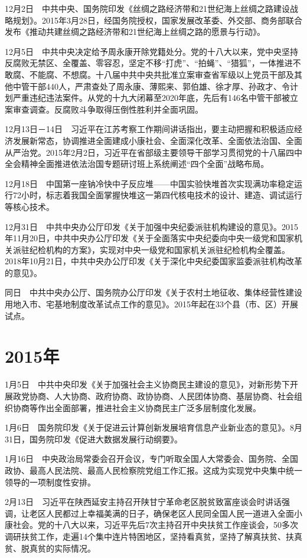 \documentclass[10pt,a4paper,twocolumn]{book}
\begin{document}
12月2日　中共中央、国务院印发《丝绸之路经济带和21世纪海上丝绸之路建设战略规划》。2015年3月28日，经国务院授权，国家发展改革委、外交部、商务部联合发布《推动共建丝绸之路经济带和21世纪海上丝绸之路的愿景与行动》。

12月5日　中共中央决定给予周永康开除党籍处分。党的十八大以来，党中央坚持反腐败无禁区、全覆盖、零容忍，坚定不移“打虎”、“拍蝇”、“猎狐”，一体推进不敢腐、不能腐、不想腐。十八届中共中央共批准立案审查省军级以上党员干部及其他中管干部440人，严肃查处了周永康、薄熙来、郭伯雄、徐才厚、孙政才、令计划严重违纪违法案件。从党的十九大闭幕至2020年底，先后有146名中管干部被立案审查调查。反腐败斗争取得压倒性胜利并全面巩固。

12月13日－14日　习近平在江苏考察工作期间讲话指出，要主动把握和积极适应经济发展新常态，协调推进全面建成小康社会、全面深化改革、全面依法治国、全面从严治党。2015年2月2日，习近平在省部级主要领导干部学习贯彻党的十八届四中全会精神全面推进依法治国专题研讨班上系统阐述“四个全面”战略布局。

12月18日　中国第一座钠冷快中子反应堆——中国实验快堆首次实现满功率稳定运行72小时，标志着我国全面掌握快堆这一第四代核电技术的设计、建造、调试运行等核心技术。

12月31日　中共中央办公厅印发《关于加强中央纪委派驻机构建设的意见》。2015年11月20日，中共中央办公厅印发《关于全面落实中央纪委向中央一级党和国家机关派驻纪检机构的方案》，实现对中央一级党和国家机关派驻纪检机构全覆盖。2018年10月21日，中共中央办公厅印发《关于深化中央纪委国家监委派驻机构改革的意见》。

同日　中共中央办公厅、国务院办公厅印发《关于农村土地征收、集体经营性建设用地入市、宅基地制度改革试点工作的意见》。2015年起在33个县（市、区）开展试点。

\section{2015年}

1月5日　中共中央印发《关于加强社会主义协商民主建设的意见》，对新形势下开展政党协商、人大协商、政府协商、政协协商、人民团体协商、基层协商、社会组织协商等作出全面部署，推进社会主义协商民主广泛多层制度化发展。

1月6日　国务院印发《关于促进云计算创新发展培育信息产业新业态的意见》。8月31日，国务院印发《促进大数据发展行动纲要》。

1月16日　中央政治局常委会召开会议，专门听取全国人大常委会、国务院、全国政协、最高人民法院、最高人民检察院党组工作汇报。这成为实现党中央集中统一领导的一项制度性安排。

2月13日　习近平在陕西延安主持召开陕甘宁革命老区脱贫致富座谈会时讲话强调，让老区人民都过上幸福美满的日子，确保老区人民同全国人民一道进入全面小康社会。党的十八大以来，习近平先后7次主持召开中央扶贫工作座谈会，50多次调研扶贫工作，走遍14个集中连片特困地区，坚持看真贫，坚持了解真扶贫、扶真贫、脱真贫的实际情况。
\end{document}
